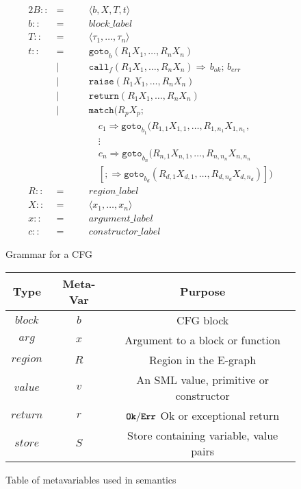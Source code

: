\documentclass{article}
\newcommand{\bttt}[1]{\texttt{\textbf{#1}}}
\begin{document}
\begin{figure}[H]
  \centering
  \begin{alignat*}{2}
    B ::&=\quad&& \langle b, X, T, t \rangle \\
    b ::&=&& block\_label \\
    T ::&=&& \langle \tau_1, \dots, \tau_n \rangle \\
    t ::&=&& \texttt{goto}_b ( R_1 X_1, \dots, R_n X_n ) \\
        &|&& \texttt{call}_f ( R_1 X_1, \dots, R_n X_n) \Rightarrow \, b_{ok}; \, b_{err} \\
        &|&& \texttt{raise} ( R_1 X_1, \dots, R_n X_n ) \\
        &|&& \texttt{return} ( R_1 X_1, \dots, R_n X_n ) \\
        &|&& \texttt{match} ( R_p X_p; \\
        &&&\quad c_1 \Rightarrow \texttt{goto}_{b_1} (R_{1,1} X_{1,1}, \dots, R_{1,n_1} X_{1,n_1},\\
        &&&\quad \vdots \\
        &&&\quad c_n \Rightarrow \texttt{goto}_{b_n} (R_{n,1} X_{n,1}, \dots, R_{n,n_n} X_{n,n_n} \\
        &&&\quad [;\Rightarrow \texttt{goto}_{b_{d}} (R_{d,1} X_{d,1}, \dots, R_{d,n_d} X_{d,n_d})] ) \\
    R ::&=&& region\_label \\
    X ::&=&& \langle x_1, \dots, x_n \rangle \\
    x ::&=&& argument\_label \\
    c ::&=&& constructor\_label
  \end{alignat*}
  \caption{Grammar for a CFG}
  \label{fig:CFG_grammar}
\end{figure}

\begin{figure}[H]
  \centering
  \begin{tabular}{c|c|c}
    \textbf{Type} & \textbf{Meta-Var} & \textbf{Purpose} \\\hline
    $block$       & $b$               & CFG block \\\hline
    $arg$         & $x$               & Argument to a block or function \\\hline
    $region$      & $R$               & Region in the E-graph \\\hline
    $value$       & $v$               & An SML value, primitive or constructor \\\hline
    $return$      & $r$               & $\bttt{Ok}/\bttt{Err}$ Ok or exceptional return\\\hline
    $store$       & $S$               & Store containing variable, value pairs
  \end{tabular}
  \caption{Table of metavariables used in semantics}
  \label{fig:metavars}
\end{figure}
\end{document}
